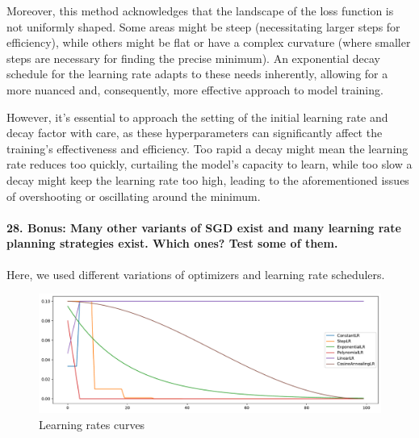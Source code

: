 \documentclass{article}
\theoremstyle{plain}%
\theoremstyle{definition}
\theoremstyle{remark}
\begin{document}
Moreover, this method acknowledges that the landscape of the loss function is not uniformly shaped. Some areas might be steep (necessitating larger steps for efficiency), while others might be flat or have a complex curvature (where smaller steps are necessary for finding the precise minimum). An exponential decay schedule for the learning rate adapts to these needs inherently, allowing for a more nuanced and, consequently, more effective approach to model training.

However, it's essential to approach the setting of the initial learning rate and decay factor with care, as these hyperparameters can significantly affect the training's effectiveness and efficiency. Too rapid a decay might mean the learning rate reduces too quickly, curtailing the model's capacity to learn, while too slow a decay might keep the learning rate too high, leading to the aforementioned issues of overshooting or oscillating around the minimum.

\paragraph{28. \textbf{Bonus}: Many other variants of SGD exist and many learning rate planning strategies exist. Which ones? Test some of them.}

Here, we used different variations of optimizers and learning rate schedulers.

\begin{figure}[H]
    \centering
    \includegraphics*[width=\textwidth]{figs/CNN/schedulers_comparison.pdf}
    \caption{Learning rates curves}
    \label{fig:schedulers_comparison}
\end{figure}
\end{document}
